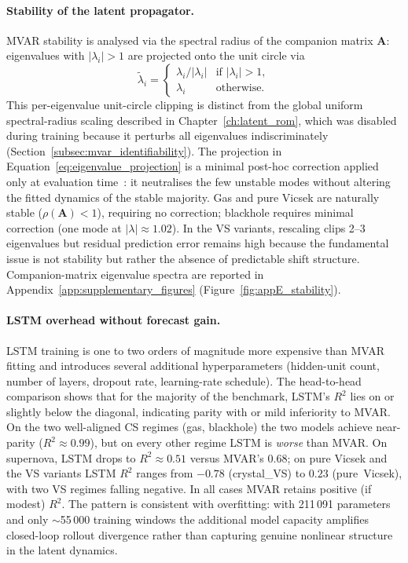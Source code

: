 \paragraph{Stability of the latent propagator.}
\label{sec:ch7_stability}

MVAR stability is analysed via the spectral radius of the companion matrix
$\mathbf{A}$: eigenvalues with $|\lambda_i|>1$ are projected onto
the unit circle via
\begin{equation}
  \tilde\lambda_i
  = \begin{cases}
      \lambda_i/|\lambda_i| & \text{if } |\lambda_i|>1, \\
      \lambda_i             & \text{otherwise.}
    \end{cases}
  \label{eq:eigenvalue_projection}
\end{equation}
This per-eigenvalue unit-circle clipping is distinct from the global
uniform spectral-radius scaling described in
Chapter~\ref{ch:latent_rom}, which was disabled during training because
it perturbs all eigenvalues indiscriminately
(Section~\ref{subsec:mvar_identifiability}).  The projection in
Equation~\eqref{eq:eigenvalue_projection} is a minimal post-hoc
correction applied only at evaluation time~\cite{gillis2019neareststable}: it neutralises the few
unstable modes without altering the fitted dynamics of the stable
majority.
Gas and pure Vicsek are naturally stable ($\rho(\mathbf{A})<1$),
requiring no correction; blackhole requires minimal correction (one mode
at $|\lambda|\approx 1.02$).  In the VS variants, rescaling clips 2--3
eigenvalues but residual prediction error remains high because the
fundamental issue is not stability but rather the absence of predictable
shift structure.  Companion-matrix eigenvalue spectra are reported in
Appendix~\ref{app:supplementary_figures}
(Figure~\ref{fig:appE_stability}).

\paragraph{LSTM overhead without forecast gain.}
\label{sec:ch7_lstm_modes}

LSTM training is one to two orders of magnitude more expensive than MVAR
fitting and introduces several additional hyperparameters (hidden-unit
count, number of layers, dropout rate, learning-rate schedule).
The head-to-head comparison shows that
for the majority of the benchmark, LSTM's $R^2$ lies on or
slightly below the diagonal, indicating parity with or mild inferiority
to MVAR\@.  On the two well-aligned CS regimes (gas, blackhole) the two
models achieve near-parity ($R^2\approx 0.99$), but on every other regime
LSTM is \emph{worse} than MVAR\@.  On supernova, LSTM drops to
$R^2\approx 0.51$ versus MVAR's $0.68$; on pure Vicsek and the VS variants
LSTM $R^2$ ranges from $-0.78$ (crystal\_VS) to $0.23$ (pure~Vicsek),
with two VS regimes falling negative.  In all cases MVAR retains
positive (if modest) $R^2$.
The pattern is consistent with overfitting: with 211\,091 parameters and
only $\sim$55\,000 training windows the additional model capacity amplifies
closed-loop rollout divergence rather than capturing genuine nonlinear
structure in the latent dynamics.

